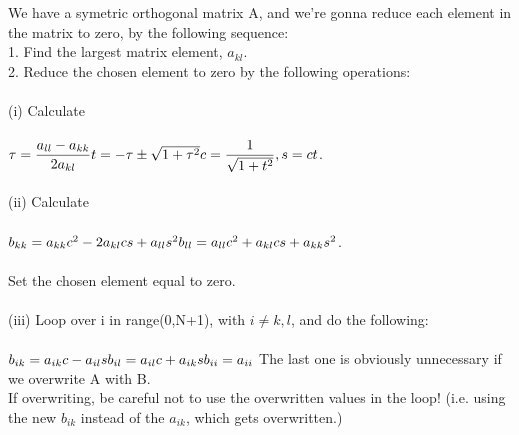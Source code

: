 \documentclass[12pt,a4paper]{article}
\begin{document}
We have a symetric orthogonal matrix A, and we're gonna reduce each element in the matrix to zero, by the following sequence:\\
1. Find the largest matrix element, $a_{kl}$.\\
2. Reduce the chosen element to zero by the following operations:\\
\\
(i) Calculate\\
\\
$\tau = \dfrac{a_{ll}-a_{kk}}{2a_{kl}}\\
\\
t = -\tau \pm \sqrt{1+\tau^2}\\
\\
c = \dfrac{1}{\sqrt{1+t^2}}, s = ct$.\\
\\
(ii) Calculate\\
\\
$b_{kk} = a_{kk}c^2 - 2a_{kl}cs + a_{ll}s^2\\
\\
b_{ll} = a_{ll}c^2 + a_{kl}cs + a_{kk}s^2$.\\
\\
Set the chosen element equal to zero.\\
\\
(iii) Loop over i in range(0,N+1), with $i \neq k,l$, and do the following:\\
\\
$b_{ik} = a_{ik}c - a_{il}s\\
\\
b_{il} = a_{il}c + a_{ik}s\\
\\
b_{ii} = a_{ii}\\
\\
$
The last one is obviously unnecessary if we overwrite A with B.\\
If overwriting, be careful not to use the overwritten values in the loop! (i.e. using the new $b_{ik}$ instead of the $a_{ik}$, which gets overwritten.)
\end{document}
